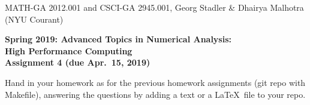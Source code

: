 \documentclass[12pt]{article}
\begin{document}
\begin{center}
  \vspace*{-2cm}
{\small MATH-GA 2012.001 and CSCI-GA 2945.001, Georg Stadler \&
  Dhairya Malhotra (NYU Courant)}
\end{center}
\vspace*{.5cm}
\begin{center}
\large \textbf{%
Spring 2019: Advanced Topics in Numerical Analysis: \\
High Performance Computing \\
Assignment 4 (due Apr.\ 15, 2019) }
\end{center}



 Hand in your homework as for
the previous homework assignments (git repo with Makefile), answering
the questions by adding a text or a \LaTeX\ file to your repo.
\\[.2ex]
\end{document}
